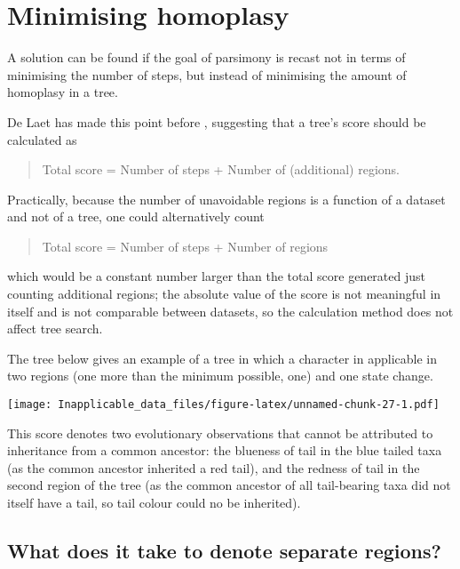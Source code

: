\documentclass[]{book}
\theoremstyle{definition}
\theoremstyle{definition}
\theoremstyle{definition}
\theoremstyle{remark}
\begin{document}
\hypertarget{minimising-homoplasy}{%
\section{Minimising homoplasy}\label{minimising-homoplasy}}

A solution can be found if the goal of parsimony is recast not in terms
of minimising the number of steps, but instead of minimising the amount
of homoplasy in a tree.

De Laet has made this point before
\citetext{\citealp{DeLaet2005}; \citeyear{DeLaet2015}}, suggesting that
a tree's score should be calculated as

\begin{quote}
Total score = Number of steps + Number of (additional) regions.
\end{quote}

Practically, because the number of unavoidable regions is a function of
a dataset and not of a tree, one could alternatively count

\begin{quote}
Total score = Number of steps + Number of regions
\end{quote}

which would be a constant number larger than the total score generated
just counting additional regions; the absolute value of the score is not
meaningful in itself and is not comparable between datasets, so the
calculation method does not affect tree search.

The tree below gives an example of a tree in which a character in
applicable in two regions (one more than the minimum possible, one) and
one state change.

\texttt{[image: Inapplicable\_data\_files/figure-latex/unnamed-chunk-27-1.pdf]}

This score denotes two evolutionary observations that cannot be
attributed to inheritance from a common ancestor: the blueness of tail
in the blue tailed taxa (as the common ancestor inherited a red tail),
and the redness of tail in the second region of the tree (as the common
ancestor of all tail-bearing taxa did not itself have a tail, so tail
colour could no be inherited).

\hypertarget{what-does-it-take-to-denote-separate-regions}{%
\subsection{What does it take to denote separate
regions?}\label{what-does-it-take-to-denote-separate-regions}}
\end{document}
